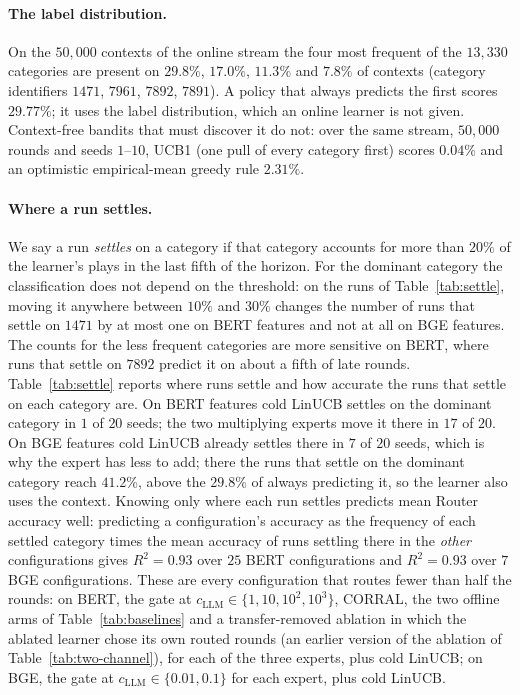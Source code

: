 \documentclass{article}
\theoremstyle{definition}
\theoremstyle{remark}
\theoremstyle{remark}
\begin{document}
\paragraph{The label distribution.}
On the $50{,}000$ contexts of the online stream the four most frequent of the
$13{,}330$ categories are present on $29.8\%$, $17.0\%$, $11.3\%$ and $7.8\%$
of contexts (category identifiers $1471$, $7961$, $7892$, $7891$). A policy
that always predicts the first scores $29.77\%$; it uses the label
distribution, which an online learner is not given. Context-free bandits that
must discover it do not: over the same stream, $50{,}000$ rounds and seeds
$1$--$10$, UCB1 (one pull of every category first) scores $0.04\%$ and an
optimistic empirical-mean greedy rule $2.31\%$.

\paragraph{Where a run settles.}
We say a run \emph{settles} on a category if that category accounts for more
than $20\%$ of the learner's plays in the last fifth of the horizon. For the
dominant category the classification does not depend on the threshold: on the
runs of Table~\ref{tab:settle}, moving it anywhere between $10\%$ and $30\%$
changes the number of runs that settle on $1471$ by at most one on BERT
features and not at all on BGE features. The counts for the less frequent
categories are more sensitive on BERT, where runs that settle on $7892$
predict it on about a fifth of late rounds. Table~\ref{tab:settle}
reports where runs settle and how accurate the runs that settle on each
category are. On BERT features cold LinUCB settles on the dominant category
in $1$ of $20$ seeds; the two multiplying experts move it there in $17$ of
$20$. On BGE features cold LinUCB already settles there in $7$ of $20$ seeds,
which is why the expert has less to add; there the runs that settle on the
dominant category reach $41.2\%$, above the $29.8\%$ of always predicting
it, so the learner also uses the context. Knowing only where each run
settles predicts mean Router accuracy well: predicting a configuration's
accuracy as the frequency of each settled category times the mean accuracy
of runs settling there in the \emph{other} configurations gives $R^2=0.93$
over $25$ BERT configurations and $R^2=0.93$ over $7$ BGE configurations.
These are every configuration that routes fewer than half the rounds: on
BERT, the gate at $c_{\mathrm{LLM}}\in\{1,10,10^2,10^3\}$, CORRAL, the two offline arms of
Table~\ref{tab:baselines} and a transfer-removed ablation in which the
ablated learner chose its own routed rounds (an earlier version of the
ablation of Table~\ref{tab:two-channel}), for each of the three experts, plus cold
LinUCB; on BGE, the gate at $c_{\mathrm{LLM}}\in\{0.01,0.1\}$ for each expert, plus cold
LinUCB.
\end{document}
